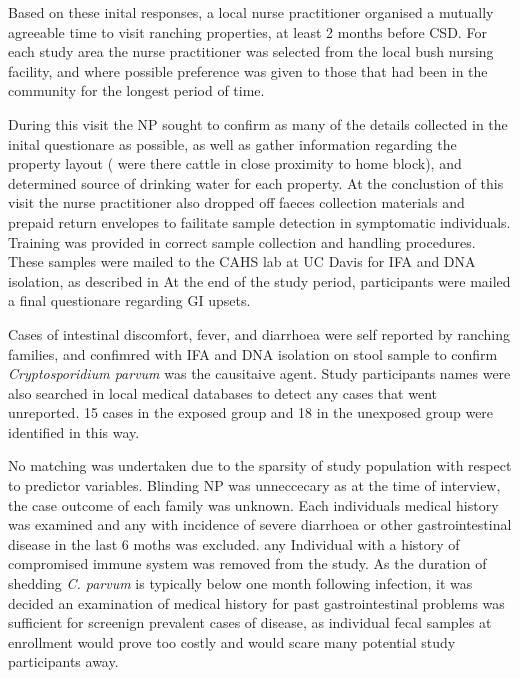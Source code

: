 \documentclass[12pt]{article}
\begin{document}
		Based on these inital responses, a local nurse practitioner organised a mutually agreeable time to visit ranching properties, at least 2 months before CSD.	%
		For each study area the nurse practitioner was selected from the local bush nursing facility, and where possible preference was given to those that had been in the community for the longest period of time.


		During this visit the NP sought to confirm as many of the details collected in the inital questionare as possible, as well as gather information regarding the property layout ( were there cattle in close proximity to home block), and determined source of drinking water for each property.
		At the conclustion of this visit the nurse practitioner also dropped off faeces collection materials and prepaid return envelopes to failitate sample detection in symptomatic individuals. 		%
		Training was provided in correct sample collection and handling procedures.
		These samples were mailed to the CAHS lab at UC Davis for IFA and DNA isolation,  as described in \cite{Atwill1999}
		At the end of the study period, participants were mailed a final questionare regarding GI upsets.
		

		Cases of intestinal discomfort, fever, and diarrhoea were self reported by ranching families, and confimred with IFA and DNA isolation on stool sample to confirm \emph{Cryptosporidium parvum} was the causitaive agent.
		Study participants names were also searched in local medical databases to detect any cases that went unreported. 15 cases in the exposed group and 18 in the unexposed group were identified in this way. 
		
		No matching was undertaken due to the sparsity of study population with respect to predictor variables. Blinding NP was unneccecary as at the time of interview, the case outcome of each family was unknown.
		Each individuals medical history was examined and any with incidence of severe diarrhoea or other gastrointestinal disease in the last 6 moths was excluded. any Individual with a history of compromised immune system was removed from the study.
		As the duration of shedding \emph{C. parvum} is typically below one month following infection, it was decided an examination of medical history for past gastrointestinal problems was sufficient for screenign prevalent cases of disease, as individual fecal samples at enrollment would prove too costly and would scare many potential study participants away.
		
\end{document}
